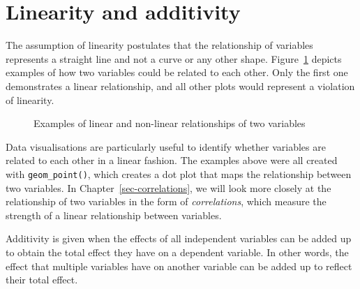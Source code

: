 \documentclass[
  letterpaper,
  DIV=11,
  numbers=noendperiod]{scrreprt}
\begin{document}
\section{Linearity and additivity}\label{sec-additivity-and-linearity}

The assumption of linearity postulates that the relationship of
variables represents a straight line and not a curve or any other shape.
Figure~\ref{fig-linear-nonlinear-relationships} depicts examples of how
two variables could be related to each other. Only the first one
demonstrates a linear relationship, and all other plots would represent
a violation of linearity.

\begin{figure}


\caption{\label{fig-linear-nonlinear-relationships}Examples of linear
and non-linear relationships of two variables}

\end{figure}%

Data visualisations are particularly useful to identify whether
variables are related to each other in a linear fashion. The examples
above were all created with \texttt{geom\_point()}, which creates a dot
plot that maps the relationship between two variables. In
Chapter~\ref{sec-correlations}, we will look more closely at the
relationship of two variables in the form of \emph{correlations}, which
measure the strength of a linear relationship between variables.

Additivity is given when the effects of all independent variables can be
added up to obtain the total effect they have on a dependent variable.
In other words, the effect that multiple variables have on another
variable can be added up to reflect their total effect.
\end{document}
